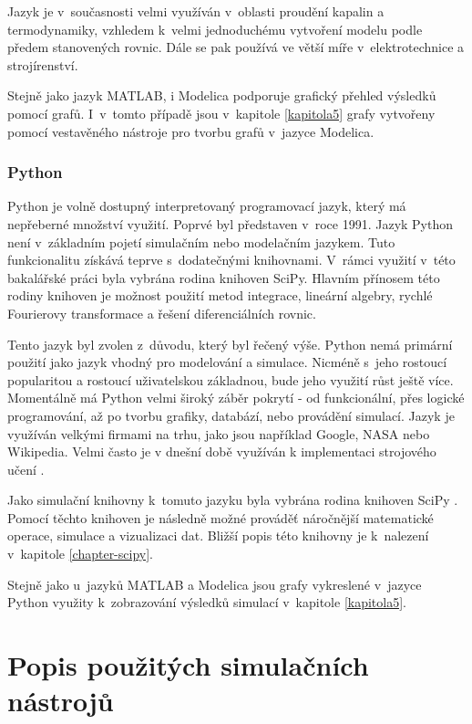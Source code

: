 Jazyk je v~současnosti velmi využíván v~oblasti proudění kapalin a termodynamiky, vzhledem k~velmi jednoduchému vytvoření modelu podle předem stanovených rovnic. Dále se pak používá ve větší míře v~elektrotechnice a strojírenství.

Stejně jako jazyk MATLAB, i Modelica podporuje grafický přehled výsledků pomocí grafů. I~v~tomto případě jsou v~kapitole \ref{kapitola5} grafy vytvořeny pomocí vestavěného nástroje pro tvorbu grafů v~jazyce Modelica.

\subsection{Python}
Python je volně dostupný interpretovaný programovací jazyk, který má nepřeberné množství využití. Poprvé byl představen v~roce 1991. Jazyk Python není v~základním pojetí simulačním nebo modelačním jazykem. Tuto funkcionalitu získává teprve s~dodatečnými knihovnami. V~rámci využití v~této bakalářské práci byla vybrána rodina knihoven SciPy. Hlavním přínosem této rodiny knihoven je možnost použití metod integrace, lineární algebry, rychlé Fourierovy transformace a řešení diferenciálních rovnic.

Tento jazyk byl zvolen z~důvodu, který byl řečený výše. Python nemá primární použití jako jazyk vhodný pro modelování a simulace. Nicméně s~jeho rostoucí popularitou a rostoucí uživatelskou základnou, bude jeho využití růst ještě více. Momentálně má Python velmi široký záběr pokrytí - od funkcionální, přes logické programování, až po tvorbu grafiky, databází, nebo provádění simulací. Jazyk je využíván velkými firmami na trhu, jako jsou například Google, NASA nebo Wikipedia. Velmi často je v dnešní době využíván k implementaci strojového učení \cite{kirk2017thoughtful}.

Jako simulační knihovny k~tomuto jazyku byla vybrána rodina knihoven SciPy \cite{scipy} \cite{Nunez-Iglesias:2017:ESA:3169538}. Pomocí těchto knihoven je následně možné prováděť náročnější matematické operace, simulace a vizualizaci dat. Bližší popis této knihovny je k~nalezení v~kapitole \ref{chapter-scipy}.

Stejně jako u~jazyků MATLAB a Modelica jsou grafy vykreslené v~jazyce Python využity k~zobrazování výsledků simulací v~kapitole \ref{kapitola5}.

\chapter{Popis použitých simulačních nástrojů}
\label{kapitola3}

